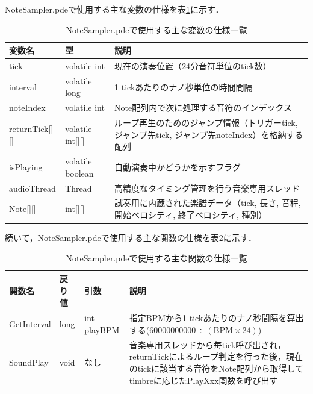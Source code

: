 NoteSampler.pdeで使用する主な変数の仕様を表\ref{table:gakki_sampler_var}に示す．

\begin{table}[H]
    \caption{NoteSampler.pdeで使用する主な変数の仕様一覧}
    \centering
    \label{table:gakki_sampler_var}
    \begin{tabular}{p{3.9cm}p{3.4cm}p{6.2cm}}
    \hline
    \textbf{変数名} & \textbf{型} & \textbf{説明}\\
    \hline
    tick & volatile int & 現在の演奏位置（24分音符単位のtick数）\\
    \hline
    interval & volatile long & 1 tickあたりのナノ秒単位の時間間隔\\
    \hline
    noteIndex & volatile int & Note配列内で次に処理する音符のインデックス\\
    \hline
    returnTick[][] & volatile int[][] & ループ再生のためのジャンプ情報（{トリガーtick, ジャンプ先tick, ジャンプ先noteIndex}）を格納する配列\\
    \hline
    isPlaying & volatile boolean & 自動演奏中かどうかを示すフラグ\\
    \hline
    audioThread & Thread & 高精度なタイミング管理を行う音楽専用スレッド\\
    \hline
    Note[][] & int[][] & 試奏用に内蔵された楽譜データ（{tick, 長さ, 音程, 開始ベロシティ, 終了ベロシティ, 種別}）\\
    \hline
    \end{tabular}
\end{table}

続いて，NoteSampler.pdeで使用する主な関数の仕様を表\ref{table:gakki_sampler_func}に示す．

\begin{table}[H]
    \caption{NoteSampler.pdeで使用する主な関数の仕様一覧}
    \centering
    \label{table:gakki_sampler_func}
    \begin{tabular}{p{2.8cm}p{1.6cm}p{2.8cm}p{6.3cm}}
    \hline
    \textbf{関数名} & \textbf{戻り値} & \textbf{引数} & \textbf{説明}\\
    \hline
    GetInterval & long & int playBPM & 指定BPMから1 tickあたりのナノ秒間隔を算出する($60000000000 \div (\text{BPM} \times 24)$)\\
    \hline
    SoundPlay & void & なし & 音楽専用スレッドから毎tick呼び出され，returnTickによるループ判定を行った後，現在のtickに該当する音符をNote配列から取得してtimbreに応じたPlayXxx関数を呼び出す\\
    \hline
    \end{tabular}
\end{table}

